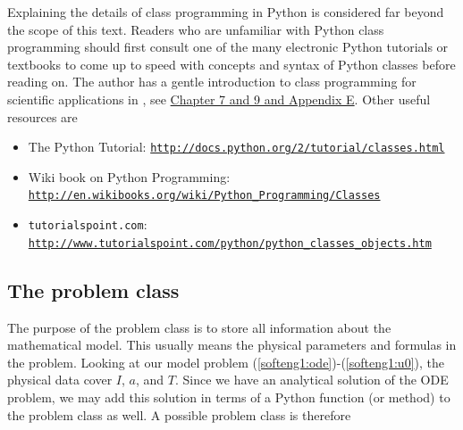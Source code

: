 \documentclass[%
oneside,                 %
final,                   %
10pt]{article}
\begin{document}
Explaining the details of class programming in Python is considered
far beyond the scope of this text.  Readers who are unfamiliar with Python
class programming should first consult one of the many electronic
Python tutorials or textbooks to come up to speed with concepts and
syntax of Python classes before reading on. The author has a gentle
introduction to class programming for scientific applications
in \cite{Langtangen_2012}, see \href{{http://hplgit.github.io/primer.html/doc/web/index.html}}{Chapter 7 and 9 and Appendix E}.
Other useful resources are

\begin{itemize}
 \item The Python Tutorial: \href{{http://docs.python.org/2/tutorial/classes.html}}{\nolinkurl{http://docs.python.org/2/tutorial/classes.html}}

 \item Wiki book on Python Programming: \href{{http://en.wikibooks.org/wiki/Python_Programming/Classes}}{\nolinkurl{http://en.wikibooks.org/wiki/Python_Programming/Classes}}

 \item \texttt{tutorialspoint.com}: \href{{http://www.tutorialspoint.com/python/python_classes_objects.htm}}{\nolinkurl{http://www.tutorialspoint.com/python/python_classes_objects.htm}}
\end{itemize}

\noindent
\subsection{The problem class}


The purpose of the problem class is to store all information about
the mathematical model. This usually means the physical parameters
and formulas
in the problem. Looking at our model problem
(\ref{softeng1:ode})-(\ref{softeng1:u0}), the physical data cover
$I$, $a$, and $T$. Since we have an analytical solution of
the ODE problem, we may add this solution in terms of a Python
function (or method) to the problem class as well.
A possible problem class is therefore
\end{document}
